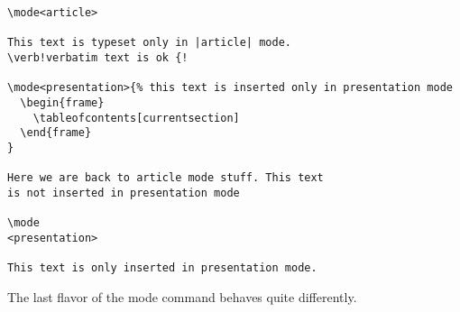 \begin{command}{\mode{}}
  \example
\begin{verbatim}
\mode<article>

This text is typeset only in |article| mode.
\verb!verbatim text is ok {!

\mode<presentation>{% this text is inserted only in presentation mode
  \begin{frame}
    \tableofcontents[currentsection]
  \end{frame}
}

Here we are back to article mode stuff. This text
is not inserted in presentation mode

\mode
<presentation>

This text is only inserted in presentation mode.
\end{verbatim}
\end{command}

The last flavor of the mode command behaves quite differently.

